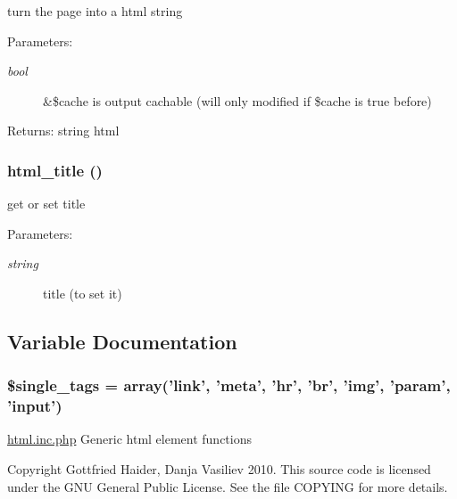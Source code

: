 turn the page into a html string

\begin{Desc}
\item[Parameters:]
\begin{description}
\item[{\em bool}]\&\$cache is output cachable (will only modified if \$cache is true before) \end{description}
\end{Desc}
\begin{Desc}
\item[Returns:]string html \end{Desc}
\hypertarget{html_8inc_8php_3f572f51a815fe19c590fea7d6d3a1a6}{
\subsubsection[{html\_\-title}]{\setlength{\rightskip}{0pt plus 5cm}html\_\-title ()}}
\label{html_8inc_8php_3f572f51a815fe19c590fea7d6d3a1a6}


get or set title

\begin{Desc}
\item[Parameters:]
\begin{description}
\item[{\em string}]title (to set it) \end{description}
\end{Desc}


\subsection{Variable Documentation}
\hypertarget{html_8inc_8php_0a733c7a281726a879f13e7325881887}{
\subsubsection[{\$single\_\-tags}]{\setlength{\rightskip}{0pt plus 5cm}\$single\_\-tags = array('link', 'meta', 'hr', 'br', 'img', 'param', 'input')}}
\label{html_8inc_8php_0a733c7a281726a879f13e7325881887}


\hyperlink{html_8inc_8php}{html.inc.php} Generic html element functions

Copyright Gottfried Haider, Danja Vasiliev 2010. This source code is licensed under the GNU General Public License. See the file COPYING for more details. 